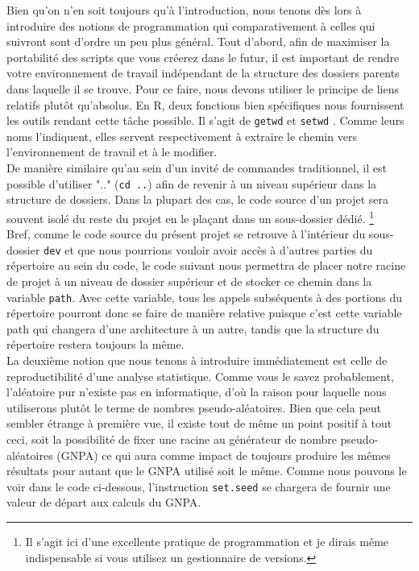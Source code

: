 Bien qu'on n'en soit toujours qu'à l'introduction, nous tenons dès lors à introduire des notions de programmation qui comparativement à celles qui suivront sont d'ordre un peu plus général. Tout d'abord, afin de maximiser la portabilité des scripts que vous créerez dans le futur, il est important de rendre votre environnement de travail indépendant de la structure des dossiers parents dans laquelle il se trouve. Pour ce faire, nous devons utiliser le principe de liens relatifs plutôt qu'absolus. En R, deux fonctions bien spécifiques nous fournissent les outils rendant cette tâche possible. Il s'agit de \texttt{getwd} et \texttt{setwd} \cite{Rfunction:setwd}. Comme leurs noms l'indiquent, elles servent respectivement à extraire le chemin vers l'environnement de travail et à le modifier. \\

De manière similaire qu'au sein d'un invité de commandes traditionnel, il est possible d'utiliser ".." (\texttt{cd ..}) afin de revenir à un niveau supérieur dans la structure de dossiers. Dans la plupart des cas, le code source d'un projet sera souvent isolé du reste du projet en le plaçant dans un sous-dossier dédié. \footnote{Il s'agit ici d'une excellente pratique de programmation et je dirais même indispensable si vous utilisez un gestionnaire de versions.} \\

Bref, comme le code source du présent projet se retrouve à l'intérieur du sous-dossier \texttt{dev} \cite{repo:RAQ} et que nous pourrions vouloir avoir accès à d'autres parties du répertoire au sein du code, le code suivant nous permettra de placer notre racine de projet à un niveau de dossier supérieur et de stocker ce chemin dans la variable \texttt{path}. Avec cette variable, tous les appels subséquents à des portions du répertoire pourront donc se faire de manière relative puisque c'est cette variable path qui changera d'une architecture à un autre, tandis que la structure du répertoire restera toujours la même. \\

La deuxième notion que nous tenons à introduire immédiatement est celle de reproductibilité d'une analyse statistique. Comme vous le savez probablement, l'aléatoire pur n'existe pas en informatique, d'où la raison pour laquelle nous utiliserons plutôt le terme de nombres pseudo-aléatoires. Bien que cela peut sembler étrange à première vue, il existe tout de même un point positif à tout ceci, soit la possibilité de fixer une racine au générateur de nombre pseudo-aléatoires (GNPA) ce qui aura comme impact de toujours produire les mêmes résultats pour autant que le GNPA utilisé soit le même. Comme nous pouvons le voir dans le code ci-dessous, l'instruction \texttt{set.seed} \cite{Rfunction:setseed} se chargera de fournir une valeur de départ aux calculs du GNPA. \\

